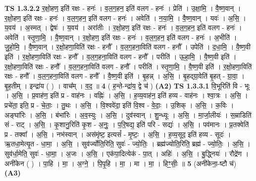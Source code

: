 \documentclass[17pt]{extarticle}
\begin{document}
                  \newline
                                \textbf{ TS 1.3.2.2} \newline
                  र॒क्षो॒हण॒ इति॑ रक्षः - हनः॑ । व॒ल॒ग॒हन॒ इति॑ वलग - हनः॑ । प्रेति॑ । उ॒क्षा॒मि॒ । वै॒ष्ण॒वान् । र॒क्षो॒हण॒ इति॑ रक्षः - हनः॑ । व॒ल॒ग॒हन॒ इति॑ वलग - हनः॑ । अवेति॑ । न॒या॒मि॒ । वै॒ष्ण॒वान् । यवः॑ । अ॒सि॒ । य॒वय॑ । अ॒स्मत् । द्वेषः॑ । य॒वय॑ । अरा॑तीः । र॒क्षो॒हण॒ इति॑ रक्षः - हनः॑ । व॒ल॒ग॒हन॒ इति॑ वलग - हनः॑ । अवेति॑ । स्तृ॒णा॒मि॒ । वै॒ष्ण॒वान् । र॒क्षो॒हण॒ इति॑ रक्षः - हनः॑ । व॒ल॒ग॒हन॒ इति॑ वलग - हनः॑ । अ॒भीति॑ । जु॒हो॒मि॒ । वै॒ष्ण॒वान् । र॒क्षो॒हणा॒विति॑ रक्षः - हनौ᳚ । व॒ल॒ग॒हना॒विति॑ वलग - हनौ᳚ । उपेति॑ । द॒धा॒मि॒ । वै॒ष्ण॒वी इति॑ । र॒क्षो॒हणा॒विति॑ रक्षः - हनौ᳚ । व॒ल॒ग॒हना॒विति॑ वलग - हनौ᳚ । परीति॑ । ऊ॒हा॒मि॒ । वै॒ष्ण॒वी इति॑ । र॒क्षो॒हणा॒विति॑ रक्षः - हनौ᳚ । व॒ल॒ग॒हना॒विति॑ वलग - हनौ᳚ । परीति॑ । स्तृ॒णा॒मि॒ । वै॒ष्ण॒वी इति॑ । र॒क्षो॒हणा॒विति॑ रक्षः - हनौ᳚ । व॒ल॒ग॒हना॒विति॑ वलग - हनौ᳚ । वै॒ष्ण॒वी इति॑ । बृ॒हन्न् । अ॒सि॒ । बृ॒हद्ग्रा॒वेति॑ बृ॒हत् - ग्रा॒वा॒ । बृ॒ह॒तीम् । इन्द्रा॑य ( ) । वाच᳚म् । व॒द॒ ॥ \textbf{  4 } \newline
                  \newline
                      ( ह॒न्ते-न्द्रा॑य॒ द्वे च॑ )  \textbf{(A2)} \newline \newline
                                \textbf{ TS 1.3.3.1} \newline
                  वि॒भूरिति॑ वि - भूः । अ॒सि॒ । प्र॒वाह॑ण॒ इति॑ प्र - वाह॑नः । वह्निः॑ । अ॒सि॒ । ह॒व्य॒वाह॑न॒ इति॑ हव्य - वाह॑नः । श्वा॒त्रः । अ॒सि॒ । प्रचे॑ता॒ इति॒ प्र - चे॒ताः॒ । तु॒थः । अ॒सि॒ । वि॒श्ववे॑दा॒ इति॑ वि॒श्व - वे॒दाः॒ । उ॒शिक् । अ॒सि॒ । क॒विः । अङ्घा॑रिः । अ॒सि॒ । बंभा॑रिः । अ॒व॒स्युः । अ॒सि॒ । दुव॑स्वान् । शु॒न्ध्यूः । अ॒सि॒ । मा॒र्जा॒लीयः॑ । स॒म्राडिति॑ सं - राट् । अ॒सि॒ । कृ॒शानु॒रिति॑ कृ॒श - अ॒नुः॒ । प॒रि॒षद्य॒ इति॑ परि - सद्यः॑ । अ॒सि॒ । पव॑मानः । प्र॒तक्वेति॑ प्र - तक्वा᳚ । अ॒सि॒ । नभ॑स्वान् । अस॑मृंष्ट॒ इत्यसं᳚ - मृ॒ष्टः॒ । अ॒सि॒ । ह॒व्य॒सूद॒ इति॑ हव्य - सूदः॑ । ऋ॒तधा॒मेत्यृ॒त - धा॒मा॒ । अ॒सि॒ । सुव॑र्ज्योति॒रिति॒ सुवः॑ - ज्यो॒तिः॒ । ब्रह्म॑ज्योति॒रिति॒ ब्रह्म॑ - ज्यो॒तिः॒ । अ॒सि॒ । सुव॑र्धा॒मेति॒ सुवः॑ - धा॒मा॒ । अ॒जः । अ॒सि॒ । एक॑पा॒दित्येक॑ - पा॒त् । अहिः॑ । अ॒सि॒ । बु॒द्ध्नियः॑ । रौद्रे॑ण । अनी॑केन ( ) । पा॒हि । मा॒ । अ॒ग्ने॒ । पि॒पृ॒हि । मा॒ । मा । मा॒ । हिꣳ॒॒सीः॒ ॥ \textbf{  5 } \newline
                  \newline
                      (अनी॑केना॒-ष्टौ च॑)  \textbf{(A3)} \newline \newline
\end{document}
